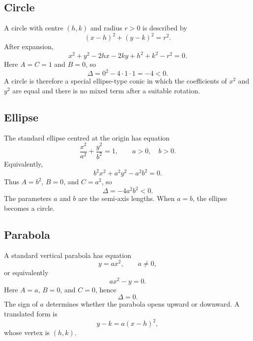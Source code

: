\subsection{Circle}

A circle with centre $(h,k)$ and radius $r>0$ is described by
\[
(x-h)^2+(y-k)^2=r^2.
\]
After expansion,
\[
x^2+y^2-2hx-2ky+h^2+k^2-r^2=0.
\]
Here $A=C=1$ and $B=0$, so
\[
\Delta=0^2-4\cdot1\cdot1=-4<0.
\]
A circle is therefore a special ellipse-type conic in which the coefficients of
$x^2$ and $y^2$ are equal and there is no mixed term after a suitable rotation.

\begin{center}
\end{center}

\subsection{Ellipse}

The standard ellipse centred at the origin has equation
\[
\frac{x^2}{a^2}+\frac{y^2}{b^2}=1,
\qquad a>0,\quad b>0.
\]
Equivalently,
\[
b^2x^2+a^2y^2-a^2b^2=0.
\]
Thus $A=b^2$, $B=0$, and $C=a^2$, so
\[
\Delta=-4a^2b^2<0.
\]
The parameters $a$ and $b$ are the semi-axis lengths. When $a=b$, the ellipse
becomes a circle.

\begin{center}
\end{center}

\subsection{Parabola}

A standard vertical parabola has equation
\[
y=ax^2,
\qquad a\neq0,
\]
or equivalently
\[
ax^2-y=0.
\]
Here $A=a$, $B=0$, and $C=0$, hence
\[
\Delta=0.
\]
The sign of $a$ determines whether the parabola opens upward or downward. A
translated form is
\[
y-k=a(x-h)^2,
\]
whose vertex is $(h,k)$.

